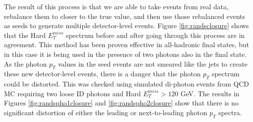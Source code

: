 The result of this process is that we are able to take events from real data, rebalance them to closer to the true value, and then use those rebalanced events as seeds to generate multiple detector-level events.  Figure \ref{fig:randsclosure} shows that the Hard $E_T^{miss}$ spectrum before and after going through this process are in agreement.  This method has been proven effective in all-hadronic final states, but in this case it is being used in the presence of two photons also in the final state.  As the photon $p_T$ values in the seed events are not smeared like the jets to create these new detector-level events, there is a danger that the photon $p_T$ spectrum could be distorted.  This was checked using simulated di-photon events from QCD MC requiring two loose ID photons and Hard $E_T^{miss}>120$ GeV.  The results in Figures \ref{fig:randspho1closure} and \ref{fig:randspho2closure} show that there is no significant distortion of either the leading or next-to-leading photon $p_T$ spectra.

